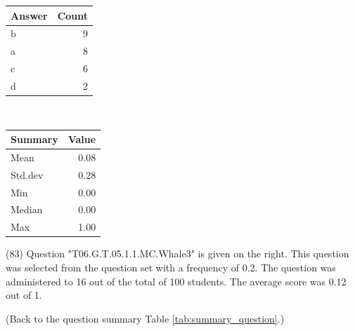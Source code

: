 \documentclass[12pt,nohyper]{tufte-handout}\usepackage[]{graphicx}\usepackage[]{color}
\begin{document}
\begin{center}%
\begin{tabular}{lr}
  \hline
Answer & Count \\ 
  \hline
b &   9 \\ 
  a &   8 \\ 
  c &   6 \\ 
  d &   2 \\ 
   \hline
\end{tabular}
~~~~~~~~%
\begin{tabular}{lr}
  \hline
Summary & Value \\ 
  \hline
Mean & 0.08 \\ 
  Std.dev & 0.28 \\ 
  Min & 0.00 \\ 
  Median & 0.00 \\ 
  Max & 1.00 \\ 
   \hline
\end{tabular}
\end{center}\newpage{} (83) Question "T06.G.T.05.1.1.MC.Whale3" is given on the right. This question was selected from the question set with a frequency of 0.2. The question was administered to 16 out of the total of 100 students. The average score was 0.12 out of 1.

 (Back to the question summary Table \ref{tab:summary_question}.)
\end{document}

